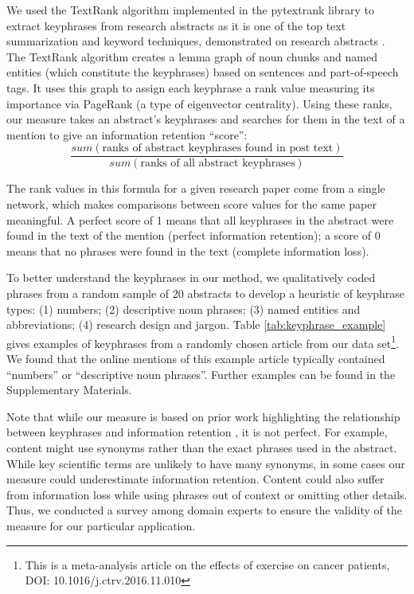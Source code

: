 \documentclass[letterpaper]{article} %
\begin{document}
We used the TextRank algorithm implemented in the pytextrank library to extract keyphrases from research abstracts as it is one of the top text summarization and keyword techniques, demonstrated on research abstracts \citep{mihalceaTextRankBringingOrder2004}.
The TextRank algorithm creates a lemma graph of noun chunks and named entities (which constitute the keyphrases) based on sentences and part-of-speech tags. It uses this graph to assign each keyphrase a rank value measuring its importance via PageRank (a type of eigenvector centrality). %
Using these ranks, our measure takes an abstract's keyphrases and searches for them in the text of a mention to give an information retention ``score'':
$$\frac{sum(\text{ranks of abstract keyphrases found in post text})}{sum(\text{ranks of all abstract keyphrases})}$$

The rank values in this formula for a given research paper come from a single network, which makes comparisons between score values for the same paper meaningful. A perfect score of 1 means that all keyphrases in the abstract were found in the text of the mention (perfect information retention); a score of 0 means that no phrases were found in the text (complete information loss).

To better understand the keyphrases in our method, we qualitatively coded phrases from a random sample of 20 abstracts to develop a heuristic of keyphrase types: (1) numbers; (2) descriptive noun phrases; (3) named entities and abbreviations; (4) research design and jargon. Table \ref{tab:keyphrase_example} gives examples of keyphrases from a randomly chosen article from our data set\footnote{This is a meta-analysis article on the effects of exercise on cancer patients, DOI: 10.1016/j.ctrv.2016.11.010}. We found that the online mentions of this example article typically contained ``numbers'' or ``descriptive noun phrases''. Further examples can be found in the Supplementary Materials.

Note that while our measure is based on prior work highlighting the relationship between keyphrases and information retention \cite{ribeiroMessageDistortionInformation2019}, it is not perfect. For example, content might use synonyms rather than the exact phrases used in the abstract. While key scientific terms are unlikely to have many synonyms, in some cases our measure could underestimate information retention. Content could also suffer from information loss while using phrases out of context or omitting other details. Thus, we conducted a survey among domain experts to ensure the validity of the measure for our particular application.
\end{document}
